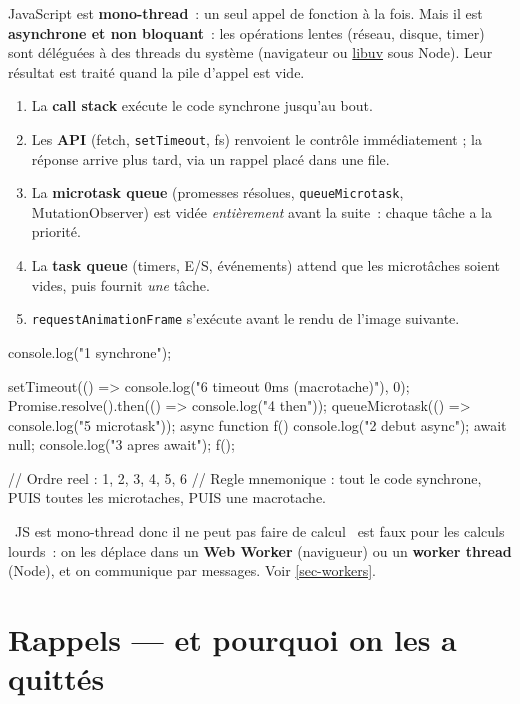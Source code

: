 \documentclass[12pt,a4paper,twoside,openright]{book}
\newcommand{\link}[2]{\href{#2}{#1}}
\begin{document}
JavaScript est \textbf{mono-thread}~: un seul appel de fonction \`a la fois. Mais il est
\textbf{asynchrone et non bloquant}~: les op\'erations lentes (r\'eseau, disque, timer) sont d\'el\'egu\'ees
\`a des threads du syst\`eme (navigateur ou \link{libuv}{https://github.com/libuv/libuv} sous Node).
Leur r\'esultat est trait\'e quand la pile d'appel est vide.

\begin{enumerate}
  \item La \textbf{call stack} ex\'ecute le code synchrone jusqu'au bout.
  \item Les \textbf{API} (fetch, \verb|setTimeout|, fs) renvoient le contr\^ole imm\'ediatement ;
        la r\'eponse arrive plus tard, via un rappel plac\'e dans une file.
  \item La \textbf{microtask queue} (promesses r\'esolues, \verb|queueMicrotask|, MutationObserver)
        est vid\'ee \emph{enti\`erement} avant la suite~: chaque t\^ache a la priorit\'e.
  \item La \textbf{task queue} (timers, E/S, \'ev\'enements) attend que les microt\^aches soient vides,
        puis fournit \emph{une} t\^ache.
  \item \verb|requestAnimationFrame| s'ex\'ecute avant le rendu de l'image suivante.
\end{enumerate}

\begin{codejs}
console.log("1 synchrone");

setTimeout(() => console.log("6 timeout 0ms (macrotache)"), 0);
Promise.resolve().then(() => console.log("4 then"));
queueMicrotask(() => console.log("5 microtask"));
async function f() { console.log("2 debut async"); await null; console.log("3 apres await"); }
f();

// Ordre reel : 1, 2, 3, 4, 5, 6
// Regle mnemonique : tout le code synchrone, PUIS toutes les microtaches, PUIS une macrotache.
\end{codejs}

\begin{note}
\og ~JS est mono-thread donc il ne peut pas faire de calcul~ \fg{} est faux pour les calculs lourds~:
on les d\'eplace dans un \textbf{Web Worker} (navigueur) ou un \textbf{worker thread} (Node),
et on communique par messages. Voir \cref{sec-workers}.
\end{note}

\section{Rappels --- et pourquoi on les a quitt\'es}
\end{document}
